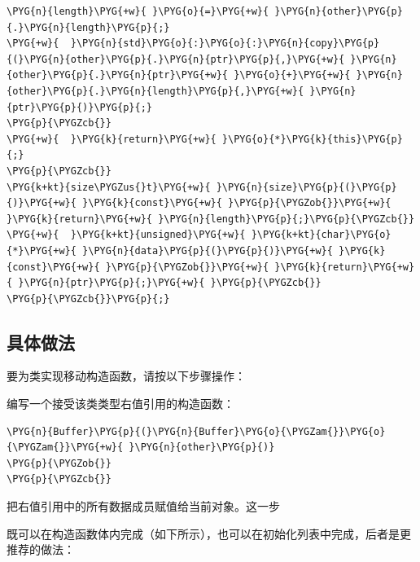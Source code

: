 \begin{codeblockbg}
\begin{Verbatim}[commandchars=\\\{\},breaklines=true,breakanywhere=true,fontsize=\codefont,xleftmargin=17bp]
\PYG{n}{length}\PYG{+w}{ }\PYG{o}{=}\PYG{+w}{ }\PYG{n}{other}\PYG{p}{.}\PYG{n}{length}\PYG{p}{;}
\PYG{+w}{  }\PYG{n}{std}\PYG{o}{:}\PYG{o}{:}\PYG{n}{copy}\PYG{p}{(}\PYG{n}{other}\PYG{p}{.}\PYG{n}{ptr}\PYG{p}{,}\PYG{+w}{ }\PYG{n}{other}\PYG{p}{.}\PYG{n}{ptr}\PYG{+w}{ }\PYG{o}{+}\PYG{+w}{ }\PYG{n}{other}\PYG{p}{.}\PYG{n}{length}\PYG{p}{,}\PYG{+w}{ }\PYG{n}{ptr}\PYG{p}{)}\PYG{p}{;}
\PYG{p}{\PYGZcb{}}
\PYG{+w}{  }\PYG{k}{return}\PYG{+w}{ }\PYG{o}{*}\PYG{k}{this}\PYG{p}{;}
\PYG{p}{\PYGZcb{}}
\PYG{k+kt}{size\PYGZus{}t}\PYG{+w}{ }\PYG{n}{size}\PYG{p}{(}\PYG{p}{)}\PYG{+w}{ }\PYG{k}{const}\PYG{+w}{ }\PYG{p}{\PYGZob{}}\PYG{+w}{ }\PYG{k}{return}\PYG{+w}{ }\PYG{n}{length}\PYG{p}{;}\PYG{p}{\PYGZcb{}}
\PYG{+w}{  }\PYG{k+kt}{unsigned}\PYG{+w}{ }\PYG{k+kt}{char}\PYG{o}{*}\PYG{+w}{ }\PYG{n}{data}\PYG{p}{(}\PYG{p}{)}\PYG{+w}{ }\PYG{k}{const}\PYG{+w}{ }\PYG{p}{\PYGZob{}}\PYG{+w}{ }\PYG{k}{return}\PYG{+w}{ }\PYG{n}{ptr}\PYG{p}{;}\PYG{+w}{ }\PYG{p}{\PYGZcb{}}
\PYG{p}{\PYGZcb{}}\PYG{p}{;}
\end{Verbatim}
\end{codeblockbg}



\subsection{具体做法}



要为类实现移动构造函数，请按以下步骤操作：



编写一个接受该类类型右值引用的构造函数：



\begin{codeblockbg}
\begin{Verbatim}[commandchars=\\\{\},breaklines=true,breakanywhere=true,fontsize=\codefont,xleftmargin=17bp]
\PYG{n}{Buffer}\PYG{p}{(}\PYG{n}{Buffer}\PYG{o}{\PYGZam{}}\PYG{o}{\PYGZam{}}\PYG{+w}{ }\PYG{n}{other}\PYG{p}{)}
\PYG{p}{\PYGZob{}}
\PYG{p}{\PYGZcb{}}
\end{Verbatim}
\end{codeblockbg}



把右值引用中的所有数据成员赋值给当前对象。这一步



既可以在构造函数体内完成（如下所示），也可以在初始化列表中完成，后者是更推荐的做法：


